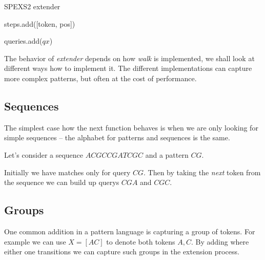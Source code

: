 \begin{algorithm}[H]
	\caption{SPEXS2 extender}
\begin{algorithmic}[1]
	
		\State steps.add([token, pos])
	\EndFor

		\EndIf
	\EndFor

		\State queries.add($qx$)
	\EndFor
\end{algorithmic}
\end{algorithm}

The behavior of \emph{extender} depends on how \emph{walk} is implemented, we shall look at different ways how to implement it. The different implementations can capture more complex patterns, but often at the cost of performance.

\subsection{Sequences}

The simplest case how the next function behaves is when we are only looking for simple sequences -- the alphabet for patterns and sequences is the same.

Let's consider a sequence $ACGCCGATCGC$ and a pattern $CG$.

\begin{figure}[H]
	
\end{figure}

Initially we have matches only for query $CG$. Then by taking the \emph{next} token from the sequence we can build up querys $CGA$ and $CGC$.

\subsection{Groups}

One common addition in a pattern language is capturing a group of tokens. For example we can use $X = [AC]$ to denote both tokens $A, C$. By adding where either one transitions we can capture such groups in the extension process.\

